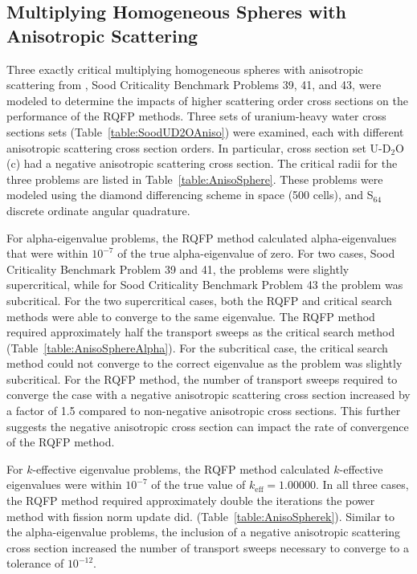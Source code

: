\clearpage

\subsection{Multiplying Homogeneous Spheres with Anisotropic Scattering}

Three exactly critical multiplying homogeneous spheres with anisotropic scattering from \cite{sood2003analytical}, Sood Criticality Benchmark Problems 39, 41, and 43, were modeled to determine the impacts of higher scattering order cross sections on the performance of the RQFP methods. Three sets of uranium-heavy water cross sections sets (Table~\ref{table:SoodUD2OAniso}) were examined, each with different anisotropic scattering cross section orders. In particular, cross section set U-D$_{2}$O (c) had a negative anisotropic scattering cross section. The critical radii for the three problems are listed in Table~\ref{table:AnisoSphere}. These problems were modeled using the diamond differencing scheme in space (500 cells), and S$_{64}$ discrete ordinate angular quadrature.

For alpha-eigenvalue problems, the RQFP method calculated alpha-eigenvalues that were within $10^{-7}$ of the true alpha-eigenvalue of zero. For two cases, Sood Criticality Benchmark Problem 39 and 41, the problems were slightly supercritical, while for Sood Criticality Benchmark Problem 43 the problem was subcritical. For the two supercritical cases, both the RQFP and critical search methods were able to converge to the same eigenvalue. The RQFP method required approximately half the transport sweeps as the critical search method (Table~\ref{table:AnisoSphereAlpha}). For the subcritical case, the critical search method could not converge to the correct eigenvalue as the problem was slightly subcritical. For the RQFP method, the number of transport sweeps required to converge the case with a negative anisotropic scattering cross section increased by a factor of 1.5 compared to non-negative anisotropic cross sections. This further suggests the negative anisotropic cross section can impact the rate of convergence of the RQFP method.

For $k$-effective eigenvalue problems, the RQFP method calculated $k$-effective eigenvalues were within $10^{-7}$ of the true value of $k_{\text{eff}}=1.00000$. In all three cases, the RQFP method required approximately double the iterations the power method with fission norm update did. (Table~\ref{table:AnisoSpherek}). Similar to the alpha-eigenvalue problems, the inclusion of a negative anisotropic scattering cross section increased the number of transport sweeps necessary to converge to a tolerance of $10^{-12}$.

